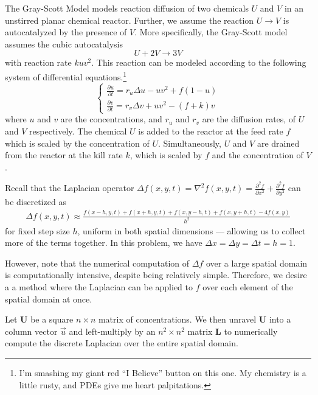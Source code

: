 The Gray-Scott Model models reaction diffusion of two chemicals $U$ and $V$ in an unstirred planar chemical reactor.
Further, we assume the reaction $U \to V$ is autocatalyzed by the presence of $V$.
More specifically, the Gray-Scott model assumes the cubic autocatalysis
\begin{equation}
    U + 2V \to 3V
\end{equation}
with reaction rate $kuv^2$.
This reaction can be modeled according to the following system of differential equations.\footnote{I'm smashing my giant red ``I Believe'' button on this one. My chemistry is a little rusty, and PDEs give me heart palpitations.}
\begin{equation}
    \begin{cases}
        \displaystyle{\frac{\partial u}{\partial t} = r_u \Delta u - uv^2 + f(1 - u)} \\[10pt]
        \displaystyle{\frac{\partial v}{\partial t} = r_v \Delta v + uv^2 - (f + k)v}
    \end{cases}\label{prob5:eqn:gray-scott}
\end{equation}
where $u$ and $v$ are the concentrations, and $r_u$ and $r_v$ are the diffusion rates, of $U$ and $V$ respectively.
The chemical $U$ is added to the reactor at the feed rate $f$ which is scaled by the concentration of $U$.
Simultaneously, $U$ and $V$ are drained from the reactor at the kill rate $k$, which is scaled by $f$ and the concentration of $V$.

Recall that the Laplacian operator $\displaystyle\Delta f(x, y, t) = \nabla^2 f(x, y, t) = \frac{\partial^2 f}{\partial x^2} + \frac{\partial^2 f}{\partial y^2}$ can be discretized as
\begin{align}
    \Delta f(x, y, t) \approx \frac{f(x - h, y, t) + f(x + h, y, t) + f(x, y - h, t) + f(x, y + h, t) - 4f(x, y)}{h^2}\label{prob5:eqn:discrete-laplacian-operator}
\end{align}
for fixed step size $h$, uniform in both spatial dimensions --- allowing us to collect more of the terms together.
In this problem, we have $\Delta x = \Delta y = \Delta t = h = 1$.

However, note that the numerical computation of $\Delta f$ over a large spatial domain is computationally intensive, despite being relatively simple.
Therefore, we desire a a method where the Laplacian can be applied to $f$ over each element of the spatial domain at once.

Let $\mathbf U$ be a square $n \times n$ matrix of concentrations.
We then unravel $\mathbf U$ into a column vector $\vec u$ and left-multiply by an $n^2 \times n^2$ matrix $\mathbf L$ to numerically compute the discrete Laplacian over the entire spatial domain.

